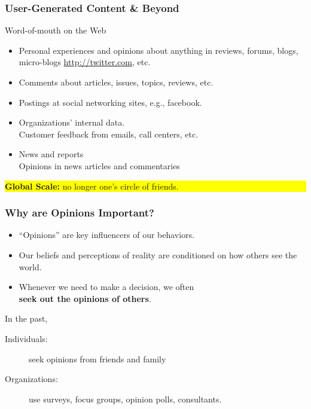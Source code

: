 \documentclass[t]{beamer}
\begin{document}
\begin{frame} \frametitle{User-Generated Content \& Beyond} %

\begin{block}{Word-of-mouth on the Web}
\begin{itemize}
 \item Personal experiences and opinions about anything in reviews,
   forums, blogs, micro-blogs \url{http://twitter.com}, etc. 
\item Comments about articles, issues, topics, reviews, etc. 
\item Postings at social networking sites, e.g., facebook.
\end{itemize}
\end{block}
 
\begin{itemize}
\item Organizations' internal data. \\ Customer feedback from emails, call centers, etc. 

\item News and reports \\ Opinions in news articles and commentaries
\end{itemize}

\vfill

\colorbox{yellow}{\parbox{0.9 \textwidth} {\textbf{Global Scale:} no longer one's circle of friends.}}

\end{frame} 



\begin{frame} \frametitle{Why are Opinions Important?} %
 
\begin{itemize}
 \item ``Opinions'' are key influencers of our behaviors.

\item Our beliefs and  perceptions of reality are conditioned on how others see the world.

\item  Whenever we need to make a decision, we often \\
  \textbf{seek out the opinions of others}.\\
\end{itemize}

\vfill
 
In the past,
 \begin{description}
 \item [Individuals:] seek opinions from friends and family 
 \item [Organizations:] use surveys, focus groups, opinion polls, consultants.
 \end{description}


\end{frame} 
\end{document}
